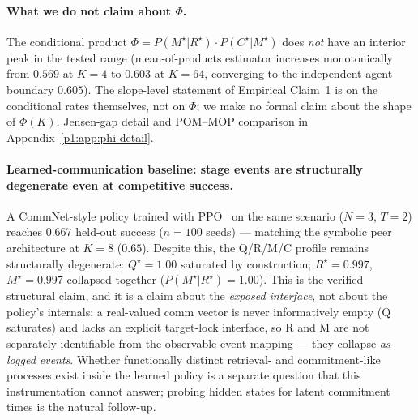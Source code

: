 \documentclass{article}
\begin{document}
\paragraph{What we do not claim about $\Phi$.} The conditional product $\Phi = P(M^\star|R^\star)\!\cdot\!P(C^\star|M^\star)$ does \emph{not} have an interior peak in the tested range (mean-of-products estimator increases monotonically from $0.569$ at $K{=}4$ to $0.603$ at $K{=}64$, converging to the independent-agent boundary $0.605$). The slope-level statement of Empirical Claim~1 is on the conditional rates themselves, not on $\Phi$; we make no formal claim about the shape of $\Phi(K)$. Jensen-gap detail and POM--MOP comparison in Appendix~\ref{p1:app:phi-detail}.

\paragraph{Learned-communication baseline: stage events are structurally degenerate even at competitive success.}
A CommNet-style policy \citep{sukhbaatar2016commnet} trained with PPO~\citep{schulman2017proximal} on the same scenario ($N{=}3$, $T{=}2$) reaches $0.667$ held-out success ($n{=}100$ seeds) --- matching the symbolic peer architecture at $K{=}8$ ($0.65$). Despite this, the Q/R/M/C profile remains structurally degenerate: $Q^\star{=}1.00$ saturated by construction; $R^\star{=}0.997$, $M^\star{=}0.997$ collapsed together ($P(M^\star|R^\star){=}1.00$). This is the verified structural claim, and it is a claim about the \emph{exposed interface}, not about the policy's internals: a real-valued comm vector is never informatively empty (Q saturates) and lacks an explicit target-lock interface, so R and M are not separately identifiable from the observable event mapping --- they collapse \emph{as logged events}. Whether functionally distinct retrieval- and commitment-like processes exist inside the learned policy is a separate question that this instrumentation cannot answer; probing hidden states for latent commitment times is the natural follow-up.
\end{document}
